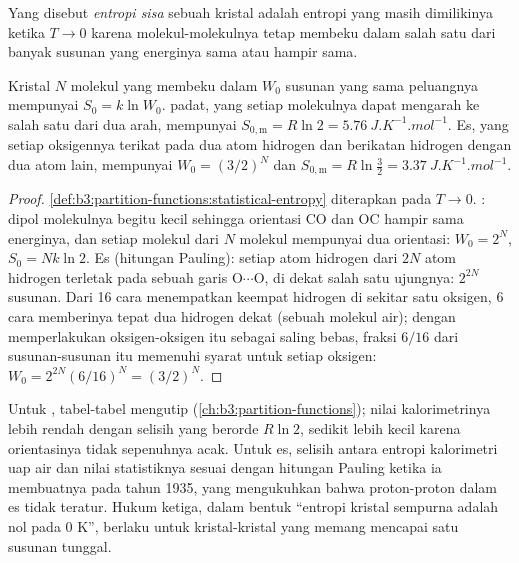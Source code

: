 \begin{definition}\label{def:b3:statistical-thermo-applied:residual-entropy}
Yang disebut \emph{entropi sisa} sebuah kristal adalah
entropi yang masih dimilikinya ketika $T \to 0$ karena molekul-molekulnya
tetap membeku dalam salah satu dari banyak susunan yang energinya sama atau
hampir sama.
\end{definition}

\begin{proposition}\label{prop:b3:statistical-thermo-applied:residual}
Kristal $N$ molekul yang membeku dalam $W_0$ susunan yang sama peluangnya
mempunyai $S_0 =
k\ln W_0$.  padat, yang setiap molekulnya dapat mengarah ke salah satu
dari dua arah, mempunyai $S_{0,\mathrm m} = R\ln2 =
\qty{5.76}{J.K^{-1}.mol^{-1}}$. Es, yang setiap oksigennya terikat pada dua atom
hidrogen dan berikatan hidrogen dengan dua atom lain, mempunyai
$W_0 = (3/2)^N$ dan $S_{0,\mathrm m} = R\ln\frac32 =
\qty{3.37}{J.K^{-1}.mol^{-1}}$.
\end{proposition}

\begin{proof}
\cref{def:b3:partition-functions:statistical-entropy} diterapkan pada $T \to 0$.
: dipol molekulnya begitu kecil sehingga orientasi CO dan OC hampir
sama energinya, dan setiap molekul dari $N$ molekul mempunyai dua orientasi:
$W_0 = 2^N$, $S_0 = Nk\ln2$. Es (hitungan Pauling): setiap atom hidrogen dari
$2N$ atom hidrogen terletak pada sebuah garis O$\cdots$O, di dekat salah satu
ujungnya: $2^{2N}$ susunan. Dari 16 cara menempatkan keempat hidrogen di
sekitar satu oksigen, 6 cara memberinya tepat dua hidrogen dekat (sebuah
molekul air); dengan memperlakukan oksigen-oksigen itu sebagai saling bebas,
fraksi $6/16$ dari susunan-susunan itu memenuhi syarat untuk setiap oksigen:
$W_0 = 2^{2N}(6/16)^N = (3/2)^N$.
\end{proof}

Untuk , tabel-tabel mengutip 
(\cref{ch:b3:partition-functions}); nilai kalorimetrinya lebih rendah dengan
selisih yang berorde $R\ln2$, sedikit lebih kecil karena orientasinya tidak
sepenuhnya acak. Untuk es, selisih antara entropi kalorimetri uap air dan nilai
statistiknya sesuai dengan hitungan Pauling ketika ia membuatnya pada tahun
1935, yang mengukuhkan bahwa proton-proton dalam es tidak teratur. Hukum
ketiga, dalam bentuk ``entropi kristal sempurna adalah nol pada 0 K'', berlaku
untuk kristal-kristal yang memang mencapai satu susunan tunggal.

